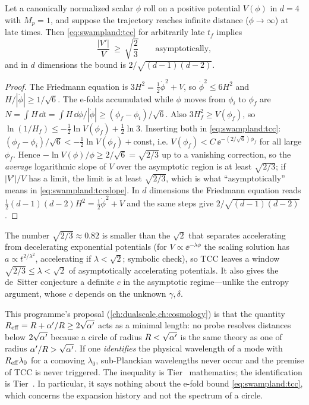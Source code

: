 \begin{proposition}\label{prop:swampland:tccslope}
Let a canonically normalized scalar $\phi$ roll on a positive potential $V(\phi)$ in $d=4$ with
$M_p=1$, and suppose the trajectory reaches infinite distance ($\phi\to\infty$) at late times.
Then \eqref{eq:swampland:tcc} for arbitrarily late $t_f$ implies
\begin{equation}\label{eq:swampland:tccslope}
\frac{|V'|}{V}\ \ge\ \sqrt{\frac23}\qquad\text{asymptotically},
\end{equation}
and in $d$ dimensions the bound is $2/\sqrt{(d-1)(d-2)}$.
\end{proposition}
\begin{proof}
The Friedmann equation is $3H^2=\tfrac12\dot\phi^2+V$, so $\dot\phi^2\le6H^2$ and
$H/|\dot\phi|\ge1/\sqrt6$. The e-folds accumulated while $\phi$ moves from $\phi_i$ to $\phi_f$ are
$N=\int H\,\dd t=\int H\,\dd\phi/|\dot\phi|\ge(\phi_f-\phi_i)/\sqrt6$. Also $3H_f^2\ge V(\phi_f)$,
so $\ln(1/H_f)\le-\tfrac12\ln V(\phi_f)+\tfrac12\ln3$. Inserting both in \eqref{eq:swampland:tcc}:
$(\phi_f-\phi_i)/\sqrt6<-\tfrac12\ln V(\phi_f)+\text{const}$, i.e.
$V(\phi_f)<C\,\ee^{-(2/\sqrt6)\phi_f}$ for all large $\phi_f$. Hence $-\ln V(\phi)/\phi\ge
2/\sqrt6=\sqrt{2/3}$ up to a vanishing correction, so the \emph{average} logarithmic slope of $V$
over the asymptotic region is at least $\sqrt{2/3}$; if $|V'|/V$ has a limit, the limit is at
least $\sqrt{2/3}$, which is what ``asymptotically'' means in \eqref{eq:swampland:tccslope}. In
$d$ dimensions the Friedmann equation reads
$\tfrac12(d-1)(d-2)H^2=\tfrac12\dot\phi^2+V$ and the same steps give $2/\sqrt{(d-1)(d-2)}$.
\end{proof}

The number $\sqrt{2/3}\approx0.82$ is smaller than the $\sqrt2$ that separates accelerating from
decelerating exponential potentials (for $V\propto\ee^{-\lambda\phi}$ the scaling solution has
$a\propto t^{2/\lambda^2}$, accelerating if $\lambda<\sqrt2$; symbolic check), so TCC leaves a window
$\sqrt{2/3}\le\lambda<\sqrt2$ of asymptotically accelerating potentials. It also gives the de~Sitter
conjecture a definite $c$ in the asymptotic regime---unlike the entropy argument, whose $c$ depends
on the unknown $\gamma,\delta$.

\begin{physicsbox}
This programme's proposal (\cref{ch:dualscale,ch:cosmology}) is that the quantity
$R_{\rm eff}=R+\alpha'/R\ge2\sqrt{\alpha'}$ acts as a minimal length: no probe resolves distances below
$2\sqrt{\alpha'}$ because a circle of radius $R<\sqrt{\alpha'}$ is the same theory as one of radius
$\alpha'/R>\sqrt{\alpha'}$. If one \emph{identifies} the physical wavelength of a mode with
$R_{\rm eff}\lambda_0$ for a comoving $\lambda_0$, sub-Planckian wavelengths never occur and the
premise of TCC is never triggered. The inequality is Tier~\TA{} mathematics; the identification
is Tier~\TC{}. In particular, it says nothing about the e-fold bound
\eqref{eq:swampland:tcc}, which concerns the expansion history and not the spectrum of a circle.
\end{physicsbox}

